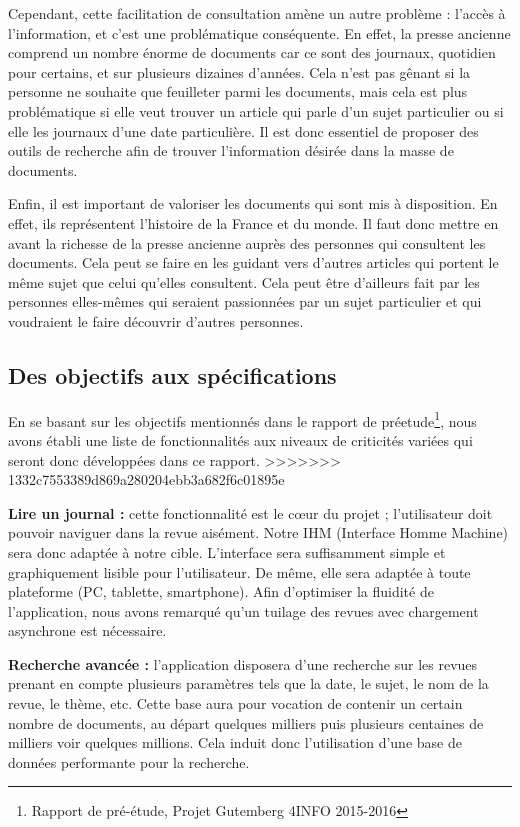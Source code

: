 		Cependant, cette facilitation de consultation amène un autre problème : l'accès à l'information, et c'est une problématique conséquente. En effet, la presse ancienne comprend un nombre énorme de documents car ce sont des journaux, quotidien pour certains, et sur plusieurs dizaines d'années. Cela n'est pas gênant si la personne ne souhaite que feuilleter parmi les documents, mais cela est plus problématique si elle veut trouver un article qui parle d'un sujet particulier ou si elle les journaux d'une date particulière. Il est donc essentiel de proposer des outils de recherche afin de trouver l'information désirée dans la masse de documents.
			
		Enfin, il est important de valoriser les documents qui sont mis à disposition. En effet, ils représentent l'histoire de la France et du monde. Il faut donc mettre en avant la richesse de la presse ancienne auprès des personnes qui consultent les documents. Cela peut se faire en les guidant vers d'autres articles qui portent le même sujet que celui qu'elles consultent. Cela peut être d'ailleurs fait par les personnes elles-mêmes qui seraient passionnées par un sujet particulier et qui voudraient le faire découvrir d'autres personnes.
		
		\subsection{Des objectifs aux spécifications}
    \label{sec:objectifs}
    En se basant sur les objectifs mentionnés dans le rapport de préetude\footnote{Rapport de pré-étude, Projet Gutemberg 4INFO 2015-2016}, nous avons établi une liste de fonctionnalités aux niveaux de criticités variées qui seront donc développées dans ce rapport.
>>>>>>> 1332c7553389d869a280204ebb3a682f6c01895e


    \textbf{Lire un journal :} cette fonctionnalité est le cœur du projet ; l'utilisateur doit pouvoir naviguer dans la revue aisément.
    Notre IHM (Interface Homme Machine) sera donc adaptée à notre cible. L’interface sera suffisamment simple et graphiquement lisible pour l'utilisateur. De même, elle sera adaptée à toute plateforme (PC, tablette, smartphone). Afin d’optimiser la fluidité de l’application, nous avons remarqué
    qu’un tuilage des revues avec chargement asynchrone est nécessaire.


    \textbf{Recherche avancée :} l’application disposera d’une recherche sur les revues prenant en compte plusieurs paramètres
    tels que la date, le sujet, le nom de la revue, le thème, etc. Cette base aura pour vocation de contenir un certain nombre de documents, au
    départ quelques milliers puis plusieurs centaines de milliers voir quelques millions. Cela induit donc l’utilisation d’une base de données
    performante pour la recherche.

